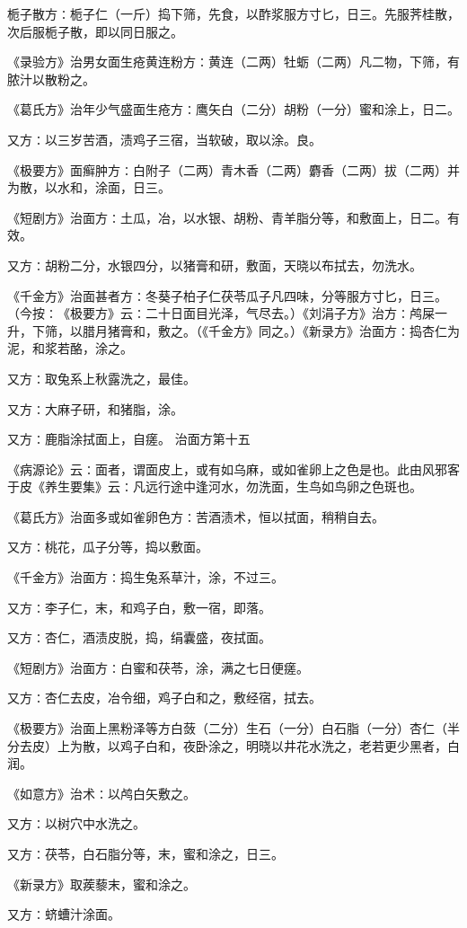 \documentclass[a4paper,12pt,UTF8,twoside]{ctexbook}
\begin{document}
栀子散方∶栀子仁（一斤）捣下筛，先食，以酢浆服方寸匕，日三。先服荠桂散，次后服栀子散，即以同日服之。

《录验方》治男女面生疮黄连粉方∶黄连（二两）牡蛎（二两）凡二物，下筛，有脓汁以散粉之。

《葛氏方》治年少气盛面生疮方∶鹰矢白（二分）胡粉（一分）蜜和涂上，日二。

又方∶以三岁苦酒，渍鸡子三宿，当软破，取以涂。良。

《极要方》面癣肿方∶白附子（二两）青木香（二两）麝香（二两）拔（二两）并为散，以水和，涂面，日三。

《短剧方》治面方∶土瓜，冶，以水银、胡粉、青羊脂分等，和敷面上，日二。有效。

又方∶胡粉二分，水银四分，以猪膏和研，敷面，天晓以布拭去，勿洗水。

《千金方》治面甚者方∶冬葵子柏子仁茯苓瓜子凡四味，分等服方寸匕，日三。（今按∶《极要方》云∶二十日面目光泽，气尽去。）《刘涓子方》治方∶鸬屎一升，下筛，以腊月猪膏和，敷之。（《千金方》同之。）《新录方》治面方∶捣杏仁为泥，和浆若酪，涂之。

又方∶取兔系上秋露洗之，最佳。

又方∶大麻子研，和猪脂，涂。

又方∶鹿脂涂拭面上，自瘥。
治面方第十五

《病源论》云∶面者，谓面皮上，或有如乌麻，或如雀卵上之色是也。此由风邪客于皮《养生要集》云∶凡远行途中逢河水，勿洗面，生鸟如鸟卵之色斑也。

《葛氏方》治面多或如雀卵色方∶苦酒渍术，恒以拭面，稍稍自去。

又方∶桃花，瓜子分等，捣以敷面。

《千金方》治面方∶捣生兔系草汁，涂，不过三。

又方∶李子仁，末，和鸡子白，敷一宿，即落。

又方∶杏仁，酒渍皮脱，捣，绢囊盛，夜拭面。

《短剧方》治面方∶白蜜和茯苓，涂，满之七日便瘥。

又方∶杏仁去皮，冶令细，鸡子白和之，敷经宿，拭去。

《极要方》治面上黑粉泽等方白蔹（二分）生石（一分）白石脂（一分）杏仁（半分去皮）上为散，以鸡子白和，夜卧涂之，明晓以井花水洗之，老若更少黑者，白润。

《如意方》治术∶以鸬白矢敷之。

又方∶以树穴中水洗之。

又方∶茯苓，白石脂分等，末，蜜和涂之，日三。

《新录方》取蒺藜末，蜜和涂之。

又方∶蛴螬汁涂面。
\end{document}
